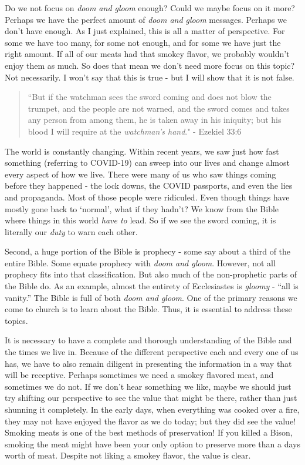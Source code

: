\documentclass[10pt]{article}
\begin{document}
\begin{multicols}{2}
Do we not focus on \textit{doom and gloom} enough? Could we maybe focus on it more? Perhaps we have the perfect amount of \textit{doom and gloom} messages. Perhaps we don't have enough. As I just explained, this is all a matter of perspective. For some we have too many, for some not enough, and for some we have just the right amount. If all of our meats had that smokey flavor, we probably wouldn't enjoy them as much. So does that mean we don’t need more focus on this topic? Not necessarily. I won't say that this is true - but I will show that it is not false.

\begin{quotation}
	``But if the watchman sees the sword coming and does not blow the trumpet, and the people are not warned, and the sword comes and takes any person from among them, he is taken away in his iniquity; but his blood I will require at the \textit{watchman’s hand}." - Ezekiel 33:6
\end{quotation}

The world is constantly changing. Within recent years, we saw just how fast something (referring to COVID-19) can sweep into our lives and change almost every aspect of how we live. There were many of us who saw things coming before they happened - the lock downs, the COVID passports, and even the lies and propaganda. Most of those people were ridiculed. Even though things have mostly gone back to `normal', what if they hadn't? We know from the Bible where things in this world \textit{have to} lead. So if we see the sword coming, it is literally our \textit{duty} to warn each other.

Second, a huge portion of the Bible is prophecy - some say about a third of the entire Bible. Some equate prophecy with \textit{doom and gloom}. However, not all prophecy fits into that classification. But also much of the non-prophetic parts of the Bible do. As an example, almost the entirety of Ecclesiastes is \textit{gloomy} - ``all is vanity.'' The Bible is full of both \textit{doom and gloom}. One of the primary reasons we come to church is to learn about the Bible. Thus, it is essential to address these topics.

It is necessary to have a complete and thorough understanding of the Bible and the times we live in. Because of the different perspective each and every one of us has, we have to also remain diligent in presenting the information in a way that will be receptive. Perhaps sometimes we need a smokey flavored meat, and sometimes we do not. If we don't hear something we like, maybe we should just try shifting our perspective to see the value that might be there, rather than just shunning it completely. In the early days, when everything was cooked over a fire, they may not have enjoyed the flavor as we do today; but they did see the value! Smoking meats is one of the best methods of preservation! If you killed a Bison, smoking the meat might have been your only option to preserve more than a days worth of meat. Despite not liking a smokey flavor, the value is clear. 


\end{multicols}
\end{document}
